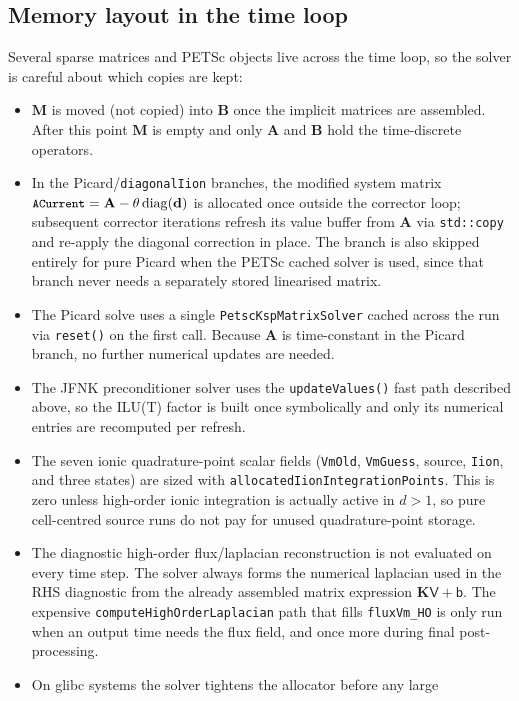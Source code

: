\documentclass[11pt,a4paper]{article}
\newcommand{\code}[1]{\texttt{\small #1}}
\newcommand{\Mmass}{\mathbf{M}}
\newcommand{\Kstif}{\mathbf{K}}
\newcommand{\Aimp}{\mathbf{A}}
\newcommand{\Bimp}{\mathbf{B}}
\begin{document}
\subsection{Memory layout in the time loop}

Several sparse matrices and PETSc objects live across the time loop, so the
solver is careful about which copies are kept:
\begin{itemize}
\item $\Mmass$ is moved (not copied) into $\Bimp$ once the implicit matrices
are assembled. After this point $\Mmass$ is empty and only $\Aimp$ and $\Bimp$
hold the time-discrete operators.
\item In the Picard/\code{diagonalIion} branches, the modified system matrix
$\code{ACurrent}=\Aimp-\theta\,\mathrm{diag}(\mathbf{d})$ is allocated once
outside the corrector loop; subsequent corrector iterations refresh its value
buffer from $\Aimp$ via \code{std::copy} and re-apply the diagonal correction
in place. The branch is also skipped entirely for pure Picard when the PETSc
cached solver is used, since that branch never needs a separately stored
linearised matrix.
\item The Picard solve uses a single \code{PetscKspMatrixSolver} cached
across the run via \code{reset()} on the first call. Because $\Aimp$ is
time-constant in the Picard branch, no further numerical updates are needed.
\item The JFNK preconditioner solver uses the \code{updateValues()} fast path
described above, so the ILU(T) factor is built once symbolically and only its
numerical entries are recomputed per refresh.
\item The seven ionic quadrature-point scalar fields
(\code{VmOld}, \code{VmGuess}, source, \code{Iion}, and three states) are sized
with \code{allocatedIionIntegrationPoints}. This is zero unless high-order
ionic integration is actually active in $d>1$, so pure cell-centred source
runs do not pay for unused quadrature-point storage.
\item The diagnostic high-order flux/laplacian reconstruction is not evaluated
on every time step. The solver always forms the numerical laplacian used in
the RHS diagnostic from the already assembled matrix expression
$\Kstif\mathsf{V}+\mathsf{b}$. The expensive
\code{computeHighOrderLaplacian} path that fills \code{fluxVm\_HO} is only run
when an output time needs the flux field, and once more during final
post-processing.
\item On glibc systems the solver tightens the allocator before any large

\end{itemize}
\end{document}
